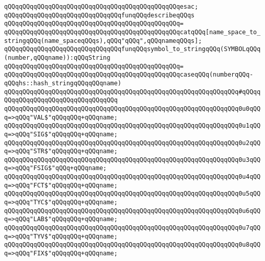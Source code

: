 \verb|qQQqqQQqqQQqqQQqqQQqqQQqqQQqqQQqqQQqqQQqqQQqqQQqesac;|\newline
\newline
\newline
\verb|qQQqqQQqqQQqqQQqqQQqqQQqqQQqqQQqfunqQQqdescribeqQQqs|\newline
\verb|qQQqqQQqqQQqqQQqqQQqqQQqqQQqqQQqqQQqqQQqqQQqqQQq=|\newline
\verb|qQQqqQQqqQQqqQQqqQQqqQQqqQQqqQQqqQQqqQQqqQQqqQQqcatqQQq[name_space_to_stringqQQq(name_spaceqQQqs),qQQq"qQQq",qQQqnameqQQqs];|\newline
\newline
\newline
\verb|qQQqqQQqqQQqqQQqqQQqqQQqqQQqqQQqfunqQQqsymbol_to_stringqQQq(SYMBOLqQQq(number,qQQqname)):qQQqString|\newline
\verb|qQQqqQQqqQQqqQQqqQQqqQQqqQQqqQQqqQQqqQQqqQQqqQQq=|\newline
\verb|qQQqqQQqqQQqqQQqqQQqqQQqqQQqqQQqqQQqqQQqqQQqqQQqcaseqQQq(numberqQQq-qQQqhs::hash_stringqQQqqQQqname)|\newline
\verb|qQQqqQQqqQQqqQQqqQQqqQQqqQQqqQQqqQQqqQQqqQQqqQQqqQQqqQQqqQQqqQQq#qQQqqQQqqQQqqQQqqQQqqQQqqQQqqQQqqQQq|\newline
\verb|qQQqqQQqqQQqqQQqqQQqqQQqqQQqqQQqqQQqqQQqqQQqqQQqqQQqqQQqqQQqqQQq0u0qQQq=>qQQq"VAL$"qQQqqQQq+qQQqname;|\newline
\verb|qQQqqQQqqQQqqQQqqQQqqQQqqQQqqQQqqQQqqQQqqQQqqQQqqQQqqQQqqQQqqQQq0u1qQQq=>qQQq"SIG$"qQQqqQQq+qQQqname;|\newline
\verb|qQQqqQQqqQQqqQQqqQQqqQQqqQQqqQQqqQQqqQQqqQQqqQQqqQQqqQQqqQQqqQQq0u2qQQq=>qQQq"STR$"qQQqqQQq+qQQqname;|\newline
\verb|qQQqqQQqqQQqqQQqqQQqqQQqqQQqqQQqqQQqqQQqqQQqqQQqqQQqqQQqqQQqqQQq0u3qQQq=>qQQq"FSIG$"qQQq+qQQqname;|\newline
\verb|qQQqqQQqqQQqqQQqqQQqqQQqqQQqqQQqqQQqqQQqqQQqqQQqqQQqqQQqqQQqqQQq0u4qQQq=>qQQq"FCT$"qQQqqQQq+qQQqname;|\newline
\verb|qQQqqQQqqQQqqQQqqQQqqQQqqQQqqQQqqQQqqQQqqQQqqQQqqQQqqQQqqQQqqQQq0u5qQQq=>qQQq"TYC$"qQQqqQQq+qQQqname;|\newline
\verb|qQQqqQQqqQQqqQQqqQQqqQQqqQQqqQQqqQQqqQQqqQQqqQQqqQQqqQQqqQQqqQQq0u6qQQq=>qQQq"LAB$"qQQqqQQq+qQQqname;|\newline
\verb|qQQqqQQqqQQqqQQqqQQqqQQqqQQqqQQqqQQqqQQqqQQqqQQqqQQqqQQqqQQqqQQq0u7qQQq=>qQQq"TYV$"qQQqqQQq+qQQqname;|\newline
\verb|qQQqqQQqqQQqqQQqqQQqqQQqqQQqqQQqqQQqqQQqqQQqqQQqqQQqqQQqqQQqqQQq0u8qQQq=>qQQq"FIX$"qQQqqQQq+qQQqname;|\newline
